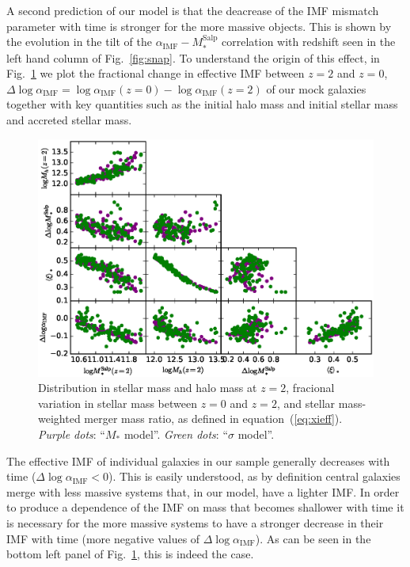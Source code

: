 \documentclass[usenatbib]{mnras}
\def\msalp{M_*^{\mathrm{Salp}}}
\def\aimf{\alpha_{\mathrm{IMF}}}
\def\Fref#1{Fig.~\ref{#1}\xspace}
\def\Eref#1{equation~(\ref{#1})\xspace}
\begin{document}
A second prediction of our model is that the deacrease of the IMF
mismatch parameter with time is stronger for the more massive
objects. This is shown by the evolution in the tilt of the
$\aimf-\msalp$ correlation with redshift seen in the left hand column
of \Fref{fig:snap}.  To understand the origin of this effect, in
\Fref{fig:cornerplot} we plot the fractional change in effective IMF
between $z=2$ and $z=0$,
$\Delta\log{\aimf}=\log{\aimf}(z=0)-\log{\aimf}(z=2)$ of our mock
galaxies together with key quantities such as the initial halo mass
and initial stellar mass and accreted stellar mass.
%
\begin{figure}
 \includegraphics[width=\textwidth]{cornerplot.eps}
 \caption{ 
   Distribution in stellar mass and halo mass at $z=2$, fracional
   variation in stellar mass between $z=0$ and $z=2$, and stellar
   mass-weighted merger mass ratio, as defined in \Eref{eq:xieff}.
   {\em Purple dots}: ``$M_*$ model''. {\em Green dots}: ``$\sigma$
   model''.  }
 \label{fig:cornerplot}
\end{figure}
%
The effective IMF of individual galaxies in our sample generally
decreases with time ($\Delta\log{\aimf}<0$). This is easily
understood, as by definition central galaxies merge with less massive
systems that, in our model, have a lighter IMF.  In order to produce a
dependence of the IMF on mass that becomes shallower with time it is
necessary for the more massive systems to have a stronger decrease in
their IMF with time (more negative values of $\Delta\log{\aimf}$).  As
can be seen in the bottom left panel of \Fref{fig:cornerplot}, this is
indeed the case.
\end{document}
